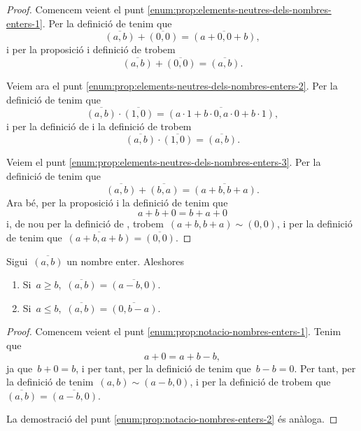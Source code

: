 \documentclass[../fonaments-de-les-matematiques.tex]{subfiles}
\begin{document}
    \begin{proof}
        Comencem veient el punt \eqref{enum:prop:elements-neutres-dels-nombres-enters-1}.
        Per la definició de  tenim que
        \[
            \overline{(a,b)}+\overline{(0,0)}=\overline{(a+0,0+b)},
        \]
        i per la proposició  i definició de   trobem
        \[
            \overline{(a,b)}+\overline{(0,0)}=\overline{(a,b)}.
        \]

        Veiem ara el punt \eqref{enum:prop:elements-neutres-dels-nombres-enters-2}.
        Per la definició de  tenim que
        \[
            \overline{(a,b)}\cdot\overline{(1,0)}=\overline{(a\cdot 1+b\cdot 0,a\cdot0+b\cdot1)},
        \]
        i per la definició de  i la definició de  trobem
        \[
            \overline{(a,b)}\cdot\overline{(1,0)}=\overline{(a,b)}.
        \]

        Veiem el punt \eqref{enum:prop:elements-neutres-dels-nombres-enters-3}.
        Per la definició de  tenim que
        \[
            \overline{(a,b)}+\overline{(b,a)}=\overline{(a+b,b+a)}.
        \]
        Ara bé, per la proposició  i la definició de  tenim que
        \[
            a+b+0=b+a+0
        \]
        i, de nou per la definició de , trobem~\((a+b,b+a)\sim(0,0)\), i per la definició de  tenim que~\(\overline{(a+b,a+b)}=\overline{(0,0)}\).
    \end{proof}
    \begin{proposition}
        \label{prop:notacio-nombres-enters}
        Sigui~\(\overline{(a,b)}\) un nombre enter.
        Aleshores
        \begin{enumerate}
            \item\label{enum:prop:notacio-nombres-enters-1} Si~\(a\geq b\),~\(\overline{(a,b)}=\overline{(a-b,0)}\).
            \item\label{enum:prop:notacio-nombres-enters-2} Si~\(a\leq b\),~\(\overline{(a,b)}=\overline{(0,b-a)}\).
        \end{enumerate}
    \end{proposition}
    \begin{proof}
        Comencem veient el punt \eqref{enum:prop:notacio-nombres-enters-1}.
        Tenim que
        \[
            a+0=a+b-b,
        \]
        ja que~\(b+0=b\), i per tant, per la definició de  tenim que~\(b-b=0\).
        Per tant, per la definició de  tenim~\((a,b)\sim(a-b,0)\), i per la definició de  trobem que~\(\overline{(a,b)}=\overline{(a-b,0)}\).

        La demostració del punt \eqref{enum:prop:notacio-nombres-enters-2} és anàloga.
    \end{proof}
\end{document}
